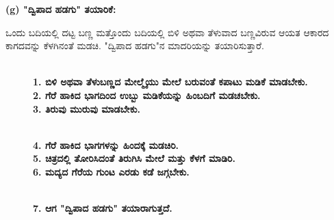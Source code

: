 \eject

\noindent
\textbf{(g) "ದ್ವಿಪಾದ ಹಡಗು" ತಯಾರಿಕೆ:}

ಒಂದು ಬದಿಯಲ್ಲಿ ದಟ್ಟ ಬಣ್ಣ ಮತ್ತೊಂದು ಬದಿಯಲ್ಲಿ ಬಿಳಿ ಅಥವಾ ತೆಳುವಾದ ಬಣ್ಣವಿರುವ ಆಯತ ಆಕಾರದ ಕಾಗದವನ್ನು ಕೆಳಗಿನಂತೆ ಮಡಚಿ. "ದ್ವಿಪಾದ ಹಡಗು"ನ ಮಾದರಿಯನ್ನು ತಯಾರಿಸುತ್ತಾರೆ. 
\begin{figure}[H]
\\
\textbf{1. ಬಿಳಿ ಅಥವಾ ತೆಳುಬಣ್ಣದ ಮೇಲ್ಮೈಯು ಮೇಲೆ ಬರುವಂತೆ ಕಪಾಟು ಮಡಿಕೆ ಮಾಡಬೇಕು.}\\
\textbf{2. ಗೆರೆ ಹಾಕಿದ ಭಾಗದಿಂದ ಉಬ್ಬು ಮಡಿಕೆಯನ್ನು ಹಿಂಬದಿಗೆ ಮಡಚಬೇಕು.}\\
\textbf{3. ತಿರುವು ಮುರುವು ಮಾಡಬೇಕು.}
\end{figure}
\begin{figure}[H]
\\
\textbf{4. ಗೆರೆ ಹಾಕಿದ ಭಾಗಗಳನ್ನು ಹಿಂದಕ್ಕೆ ಮಡಚಿರಿ.}\\
\textbf{5. ಚಿತ್ರದಲ್ಲಿ ತೋರಿಸಿದಂತೆ ತಿರುಗಿಸಿ ಮೇಲೆ ಮತ್ತು ಕೆಳಗೆ ಮಾಡಿರಿ.}\\
\textbf{6. ಮದ್ಯದ ಗೆರೆಯ ಗುಂಟ ಎರಡು ಕಡೆ ಜಗ್ಗಬೇಕು.}
\end{figure}
\begin{figure}[H]
\\
\textbf{7. ಆಗ  "ದ್ವಿಪಾದ ಹಡಗು" ತಯಾರಾಗುತ್ತದೆ.}
\end{figure}


